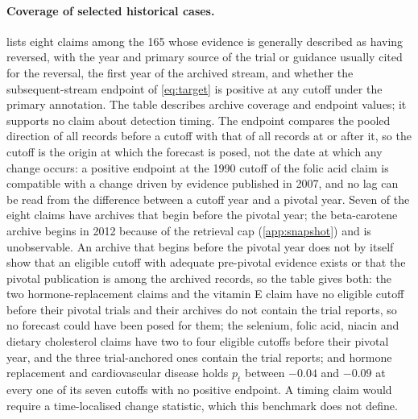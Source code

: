 \documentclass[11pt]{article}
\begin{document}
\paragraph{Coverage of selected historical cases.}  lists eight claims among
the 165 whose evidence is generally described as having reversed, with the year and primary source
of the trial or guidance usually cited for the reversal, the first year of the archived stream, and
whether the subsequent-stream endpoint of \cref{eq:target} is positive at any cutoff under the
primary annotation. The table describes archive coverage and endpoint values; it supports no
claim about detection timing. The endpoint compares the pooled direction of all records before a
cutoff with that of all records at or after it, so the cutoff is the origin at which the forecast
is posed, not the date at which any change occurs: a positive endpoint at the 1990 cutoff of the
folic acid claim is compatible with a change driven by evidence published in 2007, and no lag can
be read from the difference between a cutoff year and a pivotal year. Seven of the eight claims
have archives that begin before the pivotal year; the beta-carotene archive begins in 2012 because
of the retrieval cap (\cref{app:snapshot}) and is unobservable. An archive that begins before the
pivotal year does not by itself show that an eligible cutoff with adequate pre-pivotal evidence
exists or that the pivotal publication is among the archived records, so the table gives both:
the two hormone-replacement claims and the vitamin E claim have no eligible cutoff before their
pivotal trials and their archives do not contain the trial reports, so no forecast could have
been posed for them; the selenium, folic acid, niacin and dietary cholesterol claims have two to
four eligible cutoffs before their pivotal year, and the three trial-anchored ones contain the
trial reports; and hormone replacement and
cardiovascular disease holds $p_t$ between $-0.04$ and $-0.09$ at every one of its seven cutoffs
with no positive endpoint. A timing claim would require a time-localised change statistic, which this benchmark
does not define.
\end{document}
